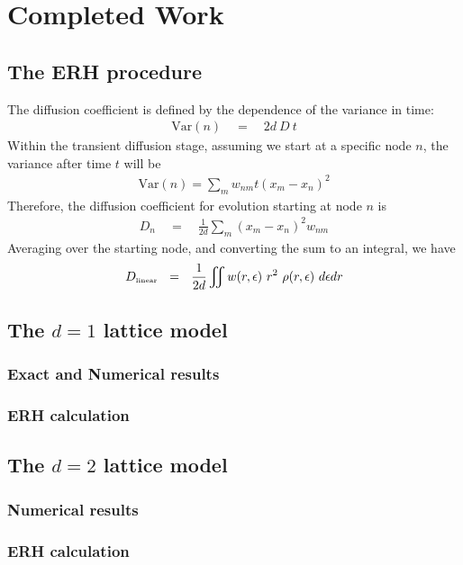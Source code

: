 \chapter{Completed Work}




\section{The ERH procedure}

The diffusion coefficient is defined by the dependence
of the variance in time:
%
\begin{align}
\textrm{Var}(n) \quad =\quad 2d\ D\ t
\end{align}
%
Within the transient diffusion stage,
assuming we start at a specific node $n$, the variance after time
$t$ will be
%
\begin{align}
\textrm{Var}(n) = \sum_m w_{nm} t (x_m-x_n)^2
\end{align}
Therefore, the diffusion coefficient for evolution 
starting at node $n$ is
%
\begin{align}
D_n \quad=\quad \frac{1}{2d}\sum_m (x_m-x_n)^2 w_{nm}
\end{align}
%
Averaging over the starting node, and converting the sum to an integral,
we have
%
\begin{align}
D_{\tbox{linear}}  \ \ = \ \ \frac{1}{2d}\iint w(r,\epsilon) \ r^2  \ \rho(r,\epsilon) \ d\epsilon dr 
\end{align}
%

\section{The $d=1$ lattice model}

\subsection{Exact and Numerical results}

\subsection{ERH calculation}



\section{The $d=2$ lattice model}

\subsection{Numerical results}

\subsection{ERH calculation}




